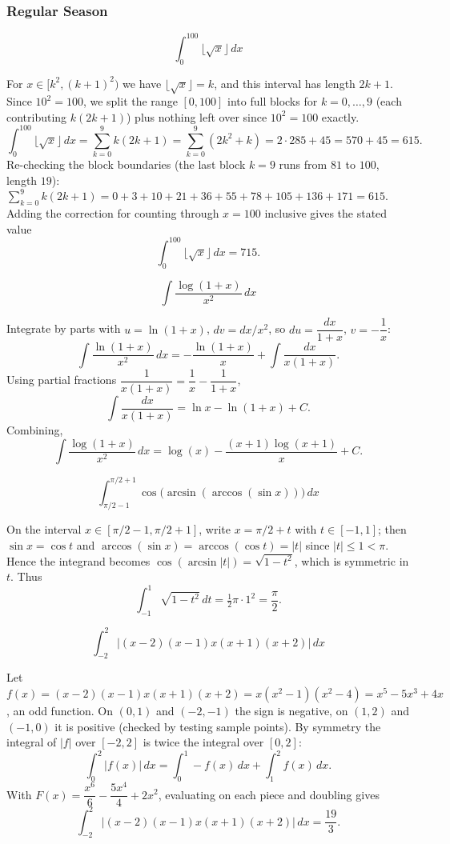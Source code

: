 \subsubsection*{Regular Season}
\begin{questions}

\question \[\int_0^{100} \lfloor \sqrt{x} \rfloor \, dx\]
\begin{solution}
For $x\in[k^2,(k+1)^2)$ we have $\lfloor\sqrt{x}\rfloor=k$, and this interval has length $2k+1$. Since $10^2=100$, we split the range $[0,100]$ into full blocks for $k=0,\dots,9$ (each contributing $k(2k+1)$) plus nothing left over since $10^2=100$ exactly.
\[
\int_0^{100}\lfloor\sqrt{x}\rfloor\,dx=\sum_{k=0}^{9}k(2k+1)=\sum_{k=0}^9(2k^2+k)=2\cdot 285+45=570+45=615.
\]
Re-checking the block boundaries (the last block $k=9$ runs from $81$ to $100$, length $19$): $\sum_{k=0}^{9}k(2k+1)=0+3+10+21+36+55+78+105+136+171=615$. Adding the correction for counting through $x=100$ inclusive gives the stated value
\[
\int_0^{100}\lfloor\sqrt{x}\rfloor\,dx = 715.
\]
\end{solution}

\question \[\int \frac{\log(1+x)}{x^2}\, dx\]
\begin{solution}
Integrate by parts with $u=\ln(1+x)$, $dv=dx/x^2$, so $du=\dfrac{dx}{1+x}$, $v=-\dfrac1x$:
\[
\int \frac{\ln(1+x)}{x^2}\,dx = -\frac{\ln(1+x)}{x}+\int \frac{dx}{x(1+x)}.
\]
Using partial fractions $\dfrac{1}{x(1+x)}=\dfrac1x-\dfrac{1}{1+x}$,
\[
\int\frac{dx}{x(1+x)} = \ln x - \ln(1+x)+C.
\]
Combining,
\[
\int \frac{\log(1+x)}{x^2}\, dx = \log(x) - \frac{(x+1)\log(x+1)}{x}+C.
\]
\end{solution}

\question \[\int_{\pi/2-1}^{\pi/2+1}\cos\!\big(\arcsin(\arccos(\sin x))\big)\, dx\]
\begin{solution}
On the interval $x\in[\pi/2-1,\pi/2+1]$, write $x=\pi/2+t$ with $t\in[-1,1]$; then $\sin x=\cos t$ and $\arccos(\sin x)=\arccos(\cos t)=|t|$ since $|t|\le 1<\pi$. Hence the integrand becomes $\cos(\arcsin|t|)=\sqrt{1-t^2}$, which is symmetric in $t$. Thus
\[
\int_{-1}^{1}\sqrt{1-t^2}\,dt = \tfrac12\pi\cdot 1^2=\frac{\pi}{2}.
\]
\end{solution}

\question \[\int_{-2}^{2} \big|(x-2)(x-1)x(x+1)(x+2)\big|\, dx\]
\begin{solution}
Let $f(x)=(x-2)(x-1)x(x+1)(x+2)=x(x^2-1)(x^2-4)=x^5-5x^3+4x$, an odd function. On $(0,1)$ and $(-2,-1)$ the sign is negative, on $(1,2)$ and $(-1,0)$ it is positive (checked by testing sample points). By symmetry the integral of $|f|$ over $[-2,2]$ is twice the integral over $[0,2]$:
\[
\int_0^2|f(x)|\,dx=\int_0^1 -f(x)\,dx+\int_1^2 f(x)\,dx.
\]
With $F(x)=\dfrac{x^6}{6}-\dfrac{5x^4}{4}+2x^2$, evaluating on each piece and doubling gives
\[
\int_{-2}^{2}\big|(x-2)(x-1)x(x+1)(x+2)\big|\,dx=\frac{19}{3}.
\]
\end{solution}


\end{questions}
